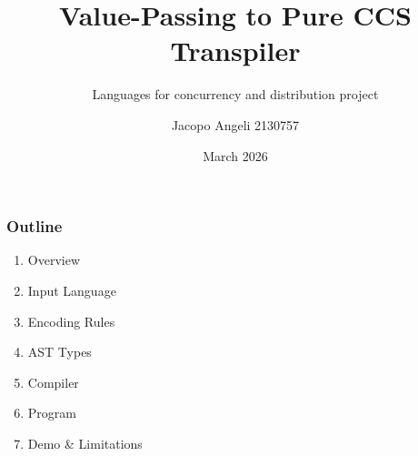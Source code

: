 \documentclass[t]{beamer}
\title{Value-Passing to Pure CCS Transpiler}
\subtitle{Languages for concurrency and distribution project}
\author{Jacopo Angeli  2130757}
\institute[UniPd]{Università degli studi di Padova}
\date{March 2026}
\begin{document}
\begin{frame}
\titlepage
\end{frame}


\begin{frame}[c]
  \frametitle{Outline}
  \begin{enumerate}
    \item Overview
    \item Input Language
    \item Encoding Rules
    \item AST Types
    \item Compiler
    \item Program
    \item Demo \& Limitations
  \end{enumerate}
\end{frame}

\end{document}
